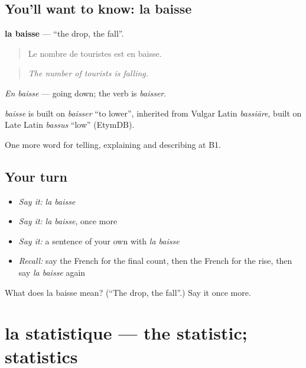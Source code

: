 \subsection*{You'll want to know: la baisse}
\textbf{la baisse} — \textquotedblleft{}the drop, the fall\textquotedblright{}.

\begin{quote}
Le nombre de touristes est en baisse.
\end{quote}

\begin{quote}
\emph{The number of tourists is falling.}
\end{quote}

\emph{En baisse} — going down; the verb is \emph{baisser}.

\begin{cousinweb}
\emph{baisse} is built on \emph{baisser} \textquotedblleft{}to lower\textquotedblright{}, inherited from Vulgar Latin \emph{bassiāre}, built on Late Latin \emph{bassus} \textquotedblleft{}low\textquotedblright{} (EtymDB).
\end{cousinweb}

\begin{grammarlens}[title={What you've built}]
One more word for telling, explaining and describing at B1.
\end{grammarlens}

\subsection*{Your turn}
\begin{itemize}
\raggedright
  \item \emph{Say it:} \emph{la baisse}
  \item \emph{Say it:} \emph{la baisse}, once more
  \item \emph{Say it:} a sentence of your own with \emph{la baisse}
  \item \emph{Recall:} say the French for the final count, then the French for the rise, then say \emph{la baisse} again
\end{itemize}

\begin{tcolorbox}[breakable,colback=teal!4,colframe=teal!35!black,title={Before you move on}]
What does la baisse mean? (\textquotedblleft{}The drop, the fall\textquotedblright{}.) Say it once more.
\end{tcolorbox}
\section[la statistique]{la statistique — the statistic; statistics}

